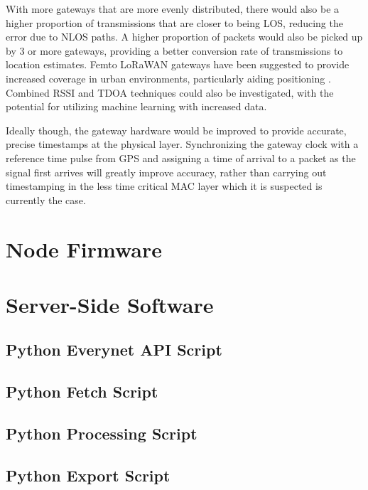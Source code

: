 \documentclass[a4paper]{report}
\begin{document}
  With more gateways that are more evenly distributed, there would also be a higher proportion of transmissions that are closer to being LOS, reducing the error due to NLOS paths. A higher proportion of packets would also be picked up by 3 or more gateways, providing a better conversion rate of transmissions to location estimates. Femto LoRaWAN gateways have been suggested to provide increased coverage in urban environments, particularly aiding positioning \cite{Lestable}. Combined RSSI and TDOA techniques could also be investigated, with the potential for utilizing machine learning with increased data.

  Ideally though, the gateway hardware would be improved to provide accurate, precise timestamps at the physical layer. Synchronizing the gateway clock with a reference time pulse from GPS and assigning a time of arrival to a packet as the signal first arrives will greatly improve accuracy, rather than carrying out timestamping in the less time critical MAC layer which it is suspected is currently the case.





\appendix
\chapter{Node Firmware} \label{ap:nodefirmware}
  

\chapter{Server-Side Software}
  \section{Python Everynet API Script} \label{ap:servereverynet}
    

  \newpage
  \section{Python Fetch Script} \label{ap:serverfetch}
    

  \newpage
  \section{Python Processing Script} \label{ap:serverprocess}
    

  \newpage
  \section{Python Export Script} \label{ap:serverexport}
    
\end{document}
